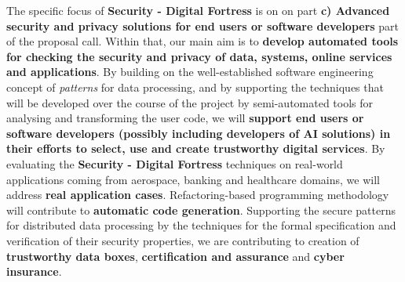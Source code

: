 \documentclass[a4paper,11pt]{article}
\newcommand{\project}[1]{\textbf{#1}\xspace}
\newcommand{\SECURITY}{\project{Security - Digital Fortress}}
\newcommand{\TheProject}{\SECURITY}
\begin{document}
The specific focus of \TheProject{} is on on part \textbf{c) Advanced security and privacy solutions for end users or software developers} part of the proposal call. Within that, our main aim is to \textbf{develop automated tools for checking the security and privacy of data, systems, online services and applications}. By building on the well-established software engineering concept of \emph{patterns} for data processing, and by supporting the techniques that will be developed over the course of the project by semi-automated tools for analysing and transforming the user code, we will \textbf{support end users or software developers (possibly including developers of AI solutions) in their efforts to select, use and create trustworthy digital services}. By evaluating the \TheProject{} techniques on real-world applications coming from aerospace, banking and healthcare domains, we will address \textbf{real application cases}. Refactoring-based programming methodology will contribute to \textbf{automatic code generation}. Supporting the secure patterns for distributed data processing by the techniques for the formal specification and verification of their security properties, we are contributing to creation of \textbf{trustworthy data boxes}, \textbf{certification and assurance} and \textbf{cyber insurance}.
\end{document}
